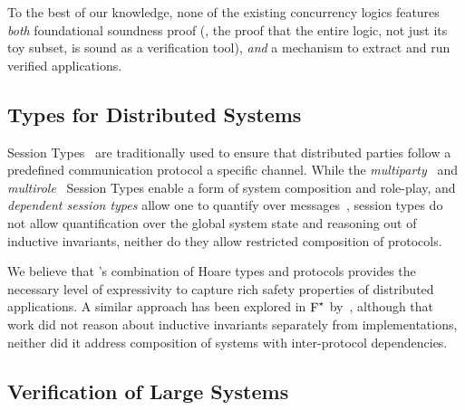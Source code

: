 To the best of our knowledge, none of the existing concurrency logics
features \emph{both} foundational soundness proof (\ie, the proof that
the entire logic, not just its toy subset, is sound as a verification
tool), \emph{and} a mechanism to extract and run verified
applications.
%

\subsection{Types for Distributed Systems}
%
%
Session Types~\cite{Honda-al:ESOP98} are traditionally used to ensure
that distributed parties follow a predefined communication protocol
\wrt a specific channel. While the
\emph{multiparty}~\cite{Honda-al:POPL08} and
\emph{multirole}~\cite{Denielou-Yoshida:POPL11} Session Types enable a
form of system composition and role-play, and \emph{dependent session
  types} allow one to quantify over messages~\cite{Toninho-al:PPDP11},
session types do not allow quantification over the global system state
and reasoning out of inductive invariants, neither do they allow
restricted composition of protocols.

We believe that \disel's combination of Hoare types and protocols
provides the necessary level of expressivity to capture rich safety
properties of distributed applications.
%
A similar approach has been explored in $\text{F}^{\star}$
by~\citet{Swamy-al:ICFP11}, although that work did not reason about
inductive invariants separately from implementations, neither did it
address composition of systems with inter-protocol dependencies.

\subsection{Verification of Large Systems}

